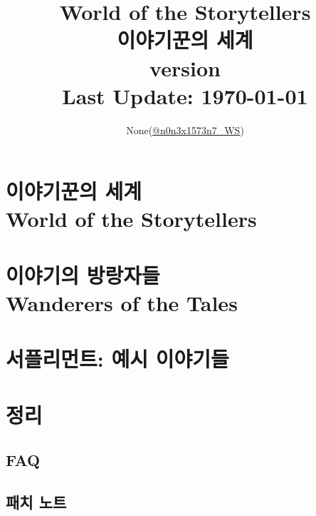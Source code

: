 \documentclass[11pt]{report}
\title{
	World of the Storytellers\\
	이야기꾼의 세계\\
	\large version \version\\
	Last Update: \today
	\ifDLC{\\ \textcolor{red}{DLC ENABLED}}\fi
}
\author{None(\href{https://www.twitter.com/n0n3x1573n7_WS}{@n0n3x1573n7\_WS})}
\date{}
\begin{document}
	\maketitle

	\vspace*{\fill}
	{\doclicenseThis}
	
	\setcounter{tocdepth}{-1}
	
	\tableofcontents
	
	\part{이야기꾼의 세계 \\ World of the Storytellers}
		
	
	\part{이야기의 방랑자들 \\ Wanderers of the Tales}
		
	
	\part{서플리먼트: 예시 이야기들}
		
	
	\part{정리}
		\chapter*{FAQ}
			
		
		\chapter*{패치 노트}
			
		
			\printindex
	
	\vspace*{\fill}
	{\doclicenseThis}
	
\end{document}
